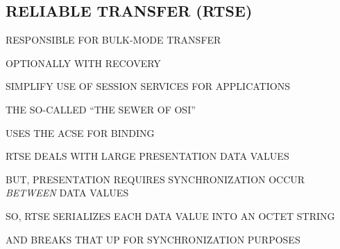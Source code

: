 \begin{bwslide}
\part*	{RELIABLE TRANSFER (RTSE)}\bf

\begin{nrtc}
\item	RESPONSIBLE FOR BULK-MODE TRANSFER
    \begin{nrtc}
    \item	OPTIONALLY WITH RECOVERY
    \end{nrtc}

\item	SIMPLIFY USE OF SESSION SERVICES FOR APPLICATIONS
    \begin{nrtc}
    \item	THE SO-CALLED ``THE SEWER OF OSI''
    \end{nrtc}

\item	USES THE ACSE FOR BINDING
\end{nrtc}
\end{bwslide}




\begin{bwslide}

\begin{nrtc}
\item	RTSE DEALS WITH LARGE PRESENTATION DATA VALUES

\item	BUT, PRESENTATION REQUIRES SYNCHRONIZATION OCCUR \emph{BETWEEN} DATA
	VALUES

\item	SO, RTSE SERIALIZES EACH DATA VALUE INTO AN OCTET STRING
    \begin{nrtc}
    \item	AND BREAKS THAT UP FOR SYNCHRONIZATION PURPOSES
    \end{nrtc}
\end{nrtc}
\end{bwslide}


